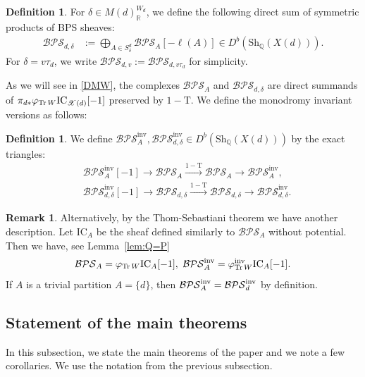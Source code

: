 \documentclass [11pt,oneside,a4paper,mathscr]{amsart}
\theoremstyle{definition}
\newtheorem{defn}[thm]{Definition}
\newtheorem{remark}[thm]{Remark}
\newcommand{\X}{\mathscr{X}}
\newcommand{\Tr}{\mathop{\rm Tr}}
\begin{document}
\begin{defn}\label{def:BPS:sum}
For $\delta \in M(d)_{\mathbb{R}}^{W_d}$, 
we define the following direct sum of symmetric 
products of BPS sheaves:
\begin{align}\label{defBPSddelta}
\mathcal{BPS}_{d,\delta}&:=\bigoplus_{A\in S^d_\delta}\mathcal{BPS}_A[-\ell(A)]\in D^b(\mathrm{Sh}_{\mathbb{Q}}(X(d))). 
\end{align}
For $\delta=v \tau_d$, we write 
$\mathcal{BPS}_{d, v}:=\mathcal{BPS}_{d,v\tau_d}$ for simplicity. 
\end{defn}
As we will see in \eqref{DMW}, the complexes $\mathcal{BPS}_A$ and $\mathcal{BPS}_{d,\delta}$
are direct summands of $\pi_{d\ast}\varphi_{\Tr W}\mathrm{IC}_{\X(d)}[-1]$ preserved by $1-\mathrm{T}$. 
We define the monodromy invariant versions as follows: 
\begin{defn}
We define 
$\mathcal{BPS}_A^{\mathrm{inv}}, \mathcal{BPS}_{d,\delta}^{\mathrm{inv}}\in D^b(\mathrm{Sh}_{\mathbb{Q}}(X(d)))$ by the exact triangles:
\begin{align*}
    &\mathcal{BPS}_A^{\mathrm{inv}}[-1]\to \mathcal{BPS}_A\xrightarrow{1-\mathrm{T}} \mathcal{BPS}_A\to \mathcal{BPS}_A^{\mathrm{inv}},\\
    &\mathcal{BPS}_{d,\delta}^{\mathrm{inv}}[-1]\to \mathcal{BPS}_{d,\delta}\xrightarrow{1-\mathrm{T}} \mathcal{BPS}_{d,\delta}\to \mathcal{BPS}_{d,\delta}^{\mathrm{inv}}.
\end{align*}
\end{defn}



\begin{remark}\label{rmk:alt}
Alternatively, by the Thom-Sebastiani theorem
we have another description. Let $\mathrm{IC}_A$ be the sheaf defined similarly to $\mathcal{BPS}_A$ 
without potential. Then 
we have, see Lemma~\ref{lem:Q=P}
\begin{align*}
\mathcal{BPS}_A=\varphi_{\mathrm{Tr}\,W}\mathrm{IC}_A[-1], \ 
\mathcal{BPS}_A^{\rm{inv}}=\varphi_{\Tr W}^{\rm{inv}} 
\mathrm{IC}_A[-1]. 
\end{align*}
If $A$ is a trivial partition $A=\{d\}$, then 
$\mathcal{BPS}_A^{\rm{inv}}=\mathcal{BPS}_d^{\rm{inv}}$
by definition. 
\end{remark}



\subsection{Statement of the main theorems}\label{subsec61}
In this subsection, we state the main theorems of the paper and we note a few corollaries.
We use the notation from the previous subsection. 
\end{document}
